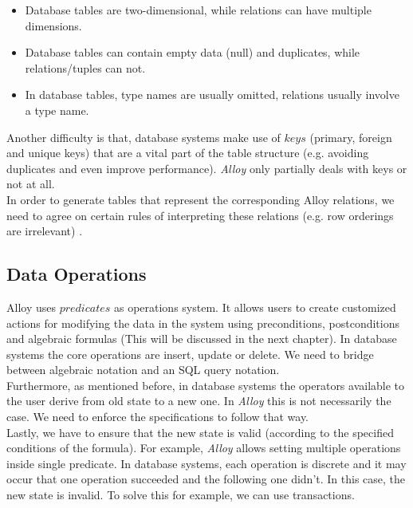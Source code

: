 \documentclass[oneside]{book}
\begin{document}
\begin{itemize}
	\item Database tables are two-dimensional, while relations can have multiple dimensions.
	\item Database tables can contain empty data (null) and duplicates, while relations/tuples can not.
	\item In database tables, type names are usually omitted, relations usually involve a type name.
\end{itemize}

Another difficulty is that, database systems make use of $keys$  (primary, foreign and unique keys) that are a vital part of the table structure (e.g. avoiding duplicates and even improve performance). \textit{Alloy} only partially deals with keys or not at all. \\

In order to generate tables that represent the corresponding Alloy relations, we need to agree on certain rules of interpreting these relations (e.g. row orderings are irrelevant) \cite[p.~151]{introtodb}.

\subsection{Data Operations}

Alloy uses $predicates$ as operations system. It allows users to create customized actions for modifying the data in the system using preconditions, postconditions and algebraic formulas (This will be discussed in the next chapter). In database systems the core operations are insert, update or delete. We need to bridge between algebraic notation and an SQL query notation.\\

Furthermore, as mentioned before, in database systems the operators available to the user derive from old state to a new one. In \textit{Alloy} this is not necessarily the case. We need to enforce the specifications to follow that way.\\

Lastly, we have to ensure that the new state is valid (according to the specified conditions of the formula). For example, \textit{Alloy} allows setting multiple operations inside single predicate. In database systems, each operation is discrete and it may occur that one operation succeeded and the following one didn't. In this case, the new state is invalid. To solve this for example, we can use transactions.\\
\end{document}
